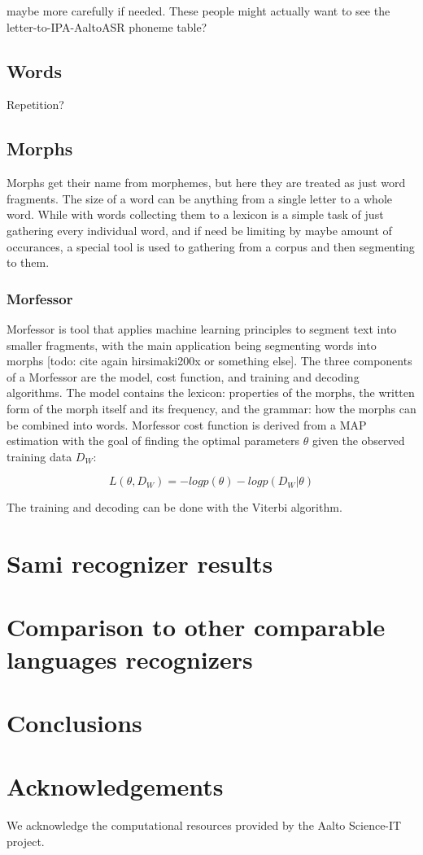 \documentclass[10pt,b5paper]{article}
\begin{document}
maybe more carefully if needed. These people might actually want to see the letter-to-IPA-AaltoASR phoneme table?




\subsection{Words}

Repetition?

\subsection{Morphs}

Morphs get their name from morphemes, but here they are treated as just word fragments. The size of a word can be anything from a single letter to a whole word. While with words collecting them to a lexicon is a simple task of just gathering every individual word, and if need be limiting by maybe amount of occurances, a special tool is used to gathering from a corpus and then segmenting to them.

\subsubsection{Morfessor}

Morfessor is tool that applies machine learning principles to segment text into smaller fragments, with the main application being segmenting words into morphs [todo: cite again hirsimaki200x or something else]. The three components of a Morfessor are the model, cost function, and training and decoding algorithms. The model contains the lexicon: properties of the morphs, the written form of the morph itself and its frequency, and the grammar: how the morphs can be combined into words. Morfessor cost function is derived from a MAP estimation with the goal of finding the optimal parameters $\theta$ given the observed training data $D_W$:

\begin{equation}
L(\theta, D_W)=-log p(\theta)-log p(D_W|\theta)
\end{equation}

The training and decoding can be done with the Viterbi algorithm.

\section{Sami recognizer results} 

\section{Comparison to other comparable languages recognizers}

\section{Conclusions} 

\section{Acknowledgements} 
We acknowledge the computational resources provided by the   Aalto Science-IT project.



 
\end{document}
